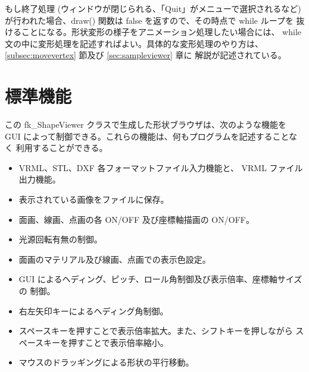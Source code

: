 もし終了処理 (ウィンドウが閉じられる、「Quit」がメニューで選択されるなど)
が行われた場合、draw() 関数は false を返すので、その時点で while ループを
抜けることになる。形状変形の様子をアニメーション処理したい場合には、
while 文の中に変形処理を記述すればよい。具体的な変形処理のやり方は、
\ref{subsec:movevertex} 節及び \ref{sec:sampleviewer} 章に
解説が記述されている。

\section{標準機能}
この fk\_ShapeViewer クラスで生成した形状ブラウザは、次のような機能を
GUI によって制御できる。これらの機能は、何もプログラムを記述することなく
利用することができる。

\begin{itemize}
 \item VRML、STL、DXF 各フォーマットファイル入力機能と、
	VRML ファイル出力機能。
 \item 表示されている画像をファイルに保存。
 \item 面画、線画、点画の各 ON/OFF 及び座標軸描画の ON/OFF。
 \item 光源回転有無の制御。
 \item 面画のマテリアル及び線画、点画での表示色設定。
 \item GUI によるヘディング、ピッチ、ロール角制御及び表示倍率、座標軸サイズの
	制御。
 \item 右左矢印キーによるヘディング角制御。
 \item スペースキーを押すことで表示倍率拡大。また、シフトキーを押しながら
	スペースキーを押すことで表示倍率縮小。
 \item マウスのドラッギングによる形状の平行移動。
\end{itemize}

